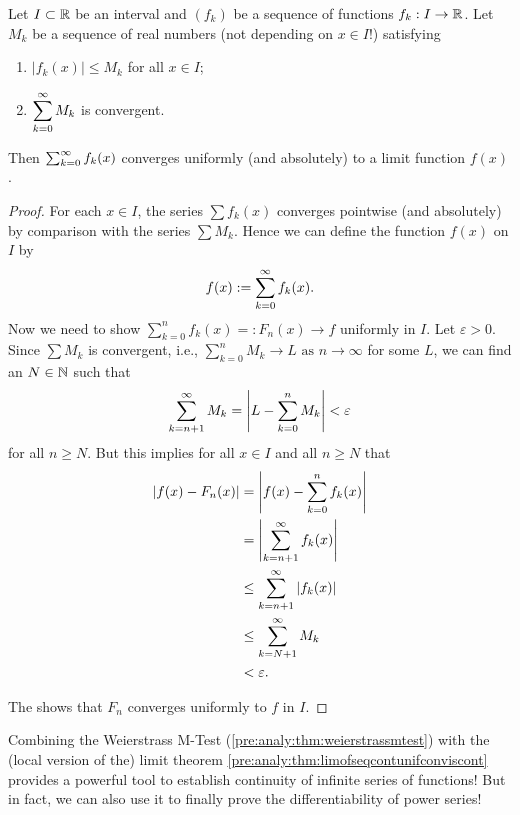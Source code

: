 \documentclass[10pt, a4paper]{article}
\newcommand{\limas}[3][n]{#2 \rightarrow #3 \text{ as } #1 \rightarrow \infty}
\begin{document}
\begin{theorem}\label{pre:analy:thm:weierstrassmtest}
    Let $I \subset \R$ be an interval and $(f_k)$ be a sequence of functions $f_k : I \rightarrow \R$.
    Let $M_k$ be a sequence of real numbers
    (not depending on $x \in I$!)
    satisfying
    \begin{enumerate}[label = (\roman*)]
        \item $|f_k(x)| \leq M_k$ for all $x \in I$;
        \item $\displaystyle\infsumo M_k$ is convergent.
    \end{enumerate}
    Then $\infsumo f_k(x)$ converges uniformly
    (and absolutely)
    to a limit function $f(x)$.

    \begin{proof}
        For each $x \in I$,
        the series $\sum f_k(x)$ converges pointwise
        (and absolutely)
        by comparison with the series $\sum M_k$.
        Hence we can define the function $f(x)$ on $I$ by
        \[
        f(x) := \infsumo f_k(x).
        \]
        Now we need to show $\sum_{k = 0}^{n}f_k(x) =: F_n(x) \rightarrow f$ uniformly in $I$.
        Let $\varepsilon > 0$.
        Since $\sum M_k$ is convergent,
        i.e.,
        $\limas{\sum_{k = 0}^{n}M_k}{L}$ for some $L$,
        we can find an $N \in \N$ such that
        \[
        \infsum[k = n + 1]M_k = \left|L - \sum_{k = 0}^{n}M_k\right| < \varepsilon
        \]
        for all $n \geq N$.
        But this implies for all $x \in I$ and all $n \geq N$ that
        \begin{align*}
            |f(x) - F_n(x)| &= \left|f(x) - \sum_{k = 0}^{n}f_k(x)\right| \\
            &= \left|\infsum[k = n + 1]f_k(x)\right| \\
            &\leq \infsum[k = n + 1]|f_k(x)| \\
            &\leq \infsum[k = N + 1]M_k \\
            &< \varepsilon.
        \end{align*}

        The shows that $F_n$ converges uniformly to $f$ in $I$.
    \end{proof}
\end{theorem}

Combining the Weierstrass M-Test
(\autoref{pre:analy:thm:weierstrassmtest})
with the
(local version of the)
limit theorem \autoref{pre:analy:thm:limofseqcontunifconviscont} provides a powerful tool to establish continuity of infinite series of functions!
But in fact,
we can also use it to finally prove the differentiability of power series!
\end{document}
